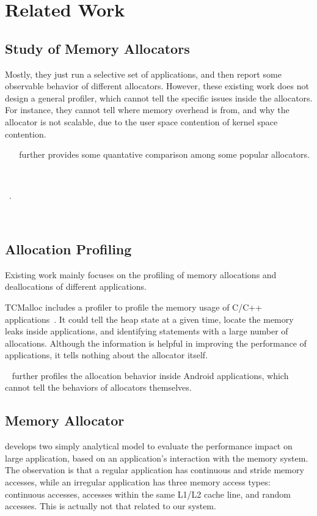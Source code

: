 \section{Related Work}

\subsection{Study of Memory Allocators}

Mostly, they just run a selective set of applications, and then report some observable behavior of different allocators. However, these existing work does not design a general profiler, which cannot tell the specific issues inside the allocators. For instance, they cannot tell where memory overhead is from, and why the allocator is not scalable, due to the user space contention of kernel space contention. 

~\cite{6118957} ~\cite{ferreira2011comparison} further provides some quantative comparison among some popular allocators. 



~\cite{Inoue:2009:SMM:1542476.1542520}

~\cite{6084042}.

~\cite{zavrtanikexperimental}

\subsection{Allocation Profiling}
Existing work mainly focuses on the profiling of memory allocations and deallocations of different applications. 

TCMalloc includes a profiler to profile the memory usage of C/C++ applications~\cite{ghemawat2007tcmalloc}. It could tell the heap state at a given time, locate the memory leaks inside applications, and identifying statements with a large number of allocations. Although the information is helpful in improving the performance of applications, it tells nothing about the allocator itself. 

~\cite{7031343} further profiles the allocation behavior inside Android applications, which cannot tell the behaviors of allocators themselves. 

\subsection{Memory Allocator}

\cite{1291361} develops two simply analytical model to evaluate the performance impact on large application, based on an application's interaction with the memory system. The observation is that a regular application has continuous and stride memory accesses, while an irregular application has three memory access types: continuous accesses, accesses within the same L1/L2 cache line, and random accesses. This is actually not that related to our system. 

